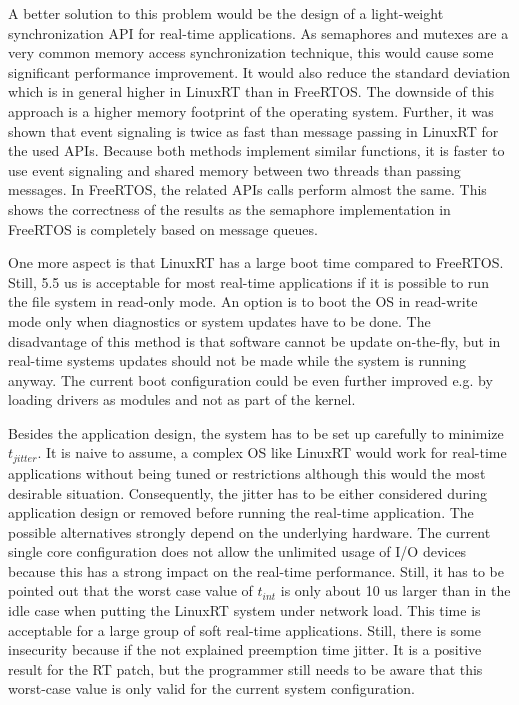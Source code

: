 A better solution to this problem would be the design of a light-weight synchronization \ac{API} for real-time applications.
As semaphores and mutexes are a very common memory access synchronization technique, this would cause some significant performance improvement.
It would also reduce the standard deviation which is in general higher in LinuxRT than in FreeRTOS.
The downside of this approach is a higher memory footprint of the operating system.
Further, it was shown that event signaling is twice as fast than message passing in LinuxRT for the used \acp{API}.
Because both methods implement similar functions, it is faster to use event signaling and shared memory between two threads than passing messages.
In FreeRTOS, the related \acp{API} calls perform almost the same.
This shows the correctness of the results as the semaphore implementation in FreeRTOS is completely based on message queues.
\par
One more aspect is that LinuxRT has a large boot time compared to FreeRTOS. 
Still, 5.5 us is acceptable for most real-time applications if it is possible to run the file system in read-only mode.
An option is to boot the \ac{OS} in read-write mode only when diagnostics or system updates have to be done.
The disadvantage of this method is that software cannot be update on-the-fly, but in real-time systems updates should not be made while the system is running anyway.
The current boot configuration could be even further improved e.g. by loading drivers as modules and not as part of the kernel.
\par
Besides the application design, the system has to be set up carefully to minimize $t_{jitter}$. 
It is naive to assume, a complex \ac{OS} like LinuxRT would work for real-time applications without being tuned or restrictions although this would the most desirable situation.
Consequently, the jitter has to be either considered during application design or removed before running the real-time application.
The possible alternatives strongly depend on the underlying hardware.
The current single core configuration does not allow the unlimited usage of \ac{I/O} devices because this has a strong impact on the real-time performance. 
Still, it has to be pointed out that the worst case value of $t_{int}$ is only about 10 us larger than in the idle case when putting the LinuxRT system under network load. 
This time is acceptable for a large group of soft real-time applications.
Still, there is some insecurity because if the not explained preemption time jitter. 
It is a positive result for the RT patch, but the programmer still needs to be aware that this worst-case value is only valid for the current system configuration. 
